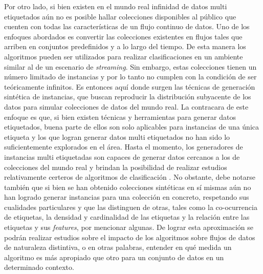Por otro lado, si bien existen en el mundo real infinidad de datos multi
etiquetados aún no es posible hallar colecciones disponibles al público que
cuenten con todas las características de un flujo continuo de datos. Uno de los
enfoques abordados es convertir las colecciones existentes en flujos tales que
arriben en conjuntos predefinidos y a lo largo del tiempo. De esta manera los
algoritmos pueden ser utilizados para realizar clasificaciones en un ambiente
similar al de un escenario de \textit{streaming}. Sin embargo, estas colecciones
tienen un número limitado de instancias y por lo tanto no cumplen con la
condición de ser teóricamente infinitos. Es entonces aquí donde surgen las
técnicas de generación sintética de instancias, que buscan reproducir la
distribución subyacente de los datos para simular colecciones de datos del mundo
real. La contracara de este enfoque es que, si bien existen técnicas y
herramientas para generar datos etiquetados, buena parte de ellos son solo
aplicables para instancias de una única etiqueta y los que logran generar datos
multi etiquetados no han sido lo suficientemente explorados en el área. Hasta el
momento, los generadores de instancias multi etiquetadas son capaces de generar
datos cercanos a los de colecciones del mundo real \cite{read_generating_2009}
y brindan la posibilidad de realizar estudios relativamente certeros de
algoritmos de clasificación \cite{read_scalable_2012}. No obstante, debe notarse
también que si bien se han obtenido colecciones sintéticas en sí mismas aún no
han logrado generar instancias para una colección en concreto, respetando sus
cualidades particulares y que las distinguen de otras, tales como la
co-ocurrencia de etiquetas, la densidad y cardinalidad de las etiquetas y la
relación entre las etiquetas y sus \textit{features}, por mencionar algunas. De
lograr esta aproximación se podrán realizar estudios sobre el impacto de los
algoritmos sobre flujos de datos de naturaleza distintiva, o en otras palabras,
entender en qué medida un algoritmo es más apropiado que otro para un conjunto
de datos en un determinado contexto. 

